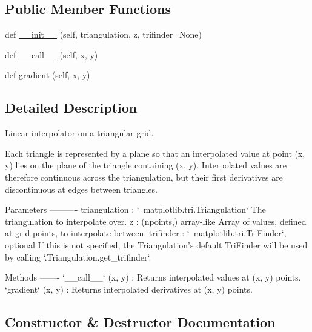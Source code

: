 \subsection*{Public Member Functions}
\begin{DoxyCompactItemize}
\item 
def \hyperlink{classmatplotlib_1_1tri_1_1triinterpolate_1_1LinearTriInterpolator_a869c534d99ffab66dee8e8f045fc83c6}{\+\_\+\+\_\+init\+\_\+\+\_\+} (self, triangulation, z, trifinder=None)
\item 
def \hyperlink{classmatplotlib_1_1tri_1_1triinterpolate_1_1LinearTriInterpolator_a37e4e685c69239ff642b6538f108c98b}{\+\_\+\+\_\+call\+\_\+\+\_\+} (self, x, y)
\item 
def \hyperlink{classmatplotlib_1_1tri_1_1triinterpolate_1_1LinearTriInterpolator_af298ec0882c80e44df4aea663ca5c999}{gradient} (self, x, y)
\end{DoxyCompactItemize}


\subsection{Detailed Description}
\begin{DoxyVerb}Linear interpolator on a triangular grid.

Each triangle is represented by a plane so that an interpolated value at
point (x, y) lies on the plane of the triangle containing (x, y).
Interpolated values are therefore continuous across the triangulation, but
their first derivatives are discontinuous at edges between triangles.

Parameters
----------
triangulation : `~matplotlib.tri.Triangulation`
    The triangulation to interpolate over.
z : (npoints,) array-like
    Array of values, defined at grid points, to interpolate between.
trifinder : `~matplotlib.tri.TriFinder`, optional
    If this is not specified, the Triangulation's default TriFinder will
    be used by calling `.Triangulation.get_trifinder`.

Methods
-------
`__call__` (x, y) : Returns interpolated values at (x, y) points.
`gradient` (x, y) : Returns interpolated derivatives at (x, y) points.\end{DoxyVerb}
 

\subsection{Constructor \& Destructor Documentation}
\mbox{\label{classmatplotlib_1_1tri_1_1triinterpolate_1_1LinearTriInterpolator_a869c534d99ffab66dee8e8f045fc83c6}} 
